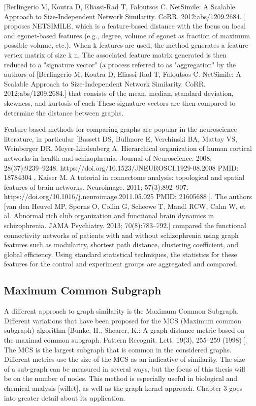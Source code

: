 [Berlingerio M, Koutra D, Eliassi-Rad T, Faloutsos C. NetSimile: A Scalable Approach to Size-Independent Network Similarity. CoRR. 2012;abs/1209.2684. ] proposes NETSIMILE, which is a feature-based distance with the  focus on local and egonet-based features (e.g., degree, volume of egonet as fraction of maximum possible volume, etc.). When k features are used, the method generates a feature-vertex matrix of size k n. The associated feature matrix generated is then reduced to a "signature vector" (a process referred to as "aggregation" by the authors of [Berlingerio M, Koutra D, Eliassi-Rad T, Faloutsos C. NetSimile: A Scalable Approach to Size-Independent Network Similarity. CoRR. 2012;abs/1209.2684.] that consists of the mean, median, standard deviation, skewness, and kurtosis of each These signature vectors are then compared to determine the distance between graphs.

Feature-based methods for comparing graphs are popular in the neuroscience literature, in particular [Bassett DS, Bullmore E, Verchinski BA, Mattay VS, Weinberger DR, Meyer-Lindenberg A. Hierarchical organization of human cortical networks in health and schizophrenia. Journal of Neuroscience. 2008; 28(37):9239–9248. https://doi.org/10.1523/JNEUROSCI.1929-08.2008 PMID: 18784304 , Kaiser M. A tutorial in connectome analysis: topological and spatial features of brain networks. Neuroimage. 2011; 57(3):892–907. https://doi.org/10.1016/j.neuroimage.2011.05.025 PMID: 21605688 ]. The authors [van den Heuvel MP, Sporns O, Collin G, Scheewe T, Mandl RCW, Cahn W, et al. Abnormal rich club organization and functional brain dynamics in schizophrenia. JAMA Psychiatry. 2013; 70(8):783–792.] compared the functional connectivity networks of patients with and without schizophrenia using graph features such as modularity, shortest path distance, clustering coefficient, and global efficiency. Using standard statistical techniques, the statistics for these features for the control and experiment groups are aggregated and compared.

\subsection{Maximum Common Subgraph}
A different approach to graph similarity is the Maximum Common Subgraph. Different variations that have been proposed for the MCS (Maximum common subgraph) algorithm [Bunke, H., Shearer, K.: A graph distance metric based on the maximal common subgraph. Pattern Recognit. Lett. 19(3), 255–259 (1998) ]. The MCS is the largest subgraph that is common in the considered graphs. Different metrics use the size of the MCS as an indicative of similarity. The size of a sub-graph can be measured in several ways, but the focus of this thesis will be on the number of nodes. This method is especially useful in biological and chemical analysis [willet], as well as the graph kernel approach. Chapter 3 goes into greater detail about its application.


